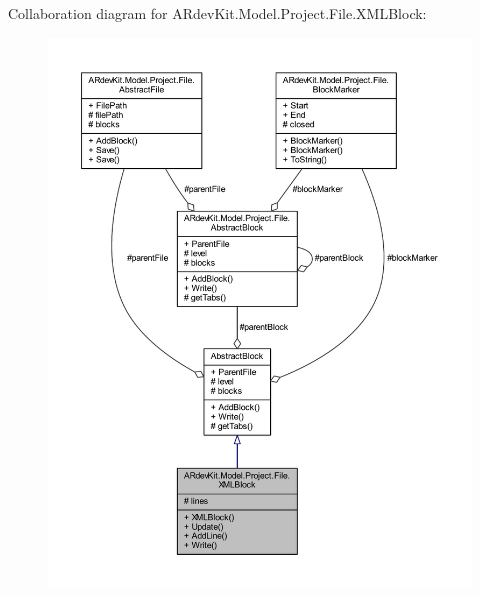 Collaboration diagram for A\-Rdev\-Kit.\-Model.\-Project.\-File.\-X\-M\-L\-Block\-:
\nopagebreak
\begin{figure}[H]
\begin{center}
\leavevmode
\includegraphics[width=350pt]{class_a_rdev_kit_1_1_model_1_1_project_1_1_file_1_1_x_m_l_block__coll__graph}
\end{center}
\end{figure}
